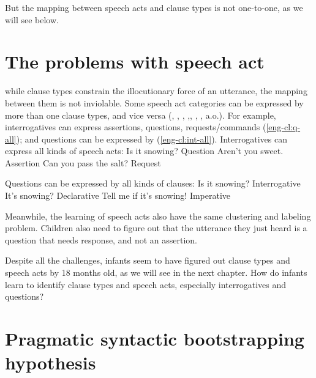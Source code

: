 But the mapping between speech acts and clause types is not one-to-one, as we will see below.







\section{The problems with speech act}
while clause types constrain the illocutionary force of an utterance, the mapping between them is not inviolable. Some speech act categories can be expressed by more than one clause types, and vice versa (\citealt{searle1975tax}, \citealt{searle1976class}, \citealt{bachharnish1979}, \citealt{levinson1983},\citealt{searlevanderveken1985}, \citealt{portner2018}, \citealt{starr2014}, \citealt{murraystarr2020} a.o.). For example, interrogatives can express assertions, questions, requests/commands (\ref{eng-cl:q-all}); and questions can be expressed by \diis{} (\ref{eng-cl:int-all}).
Interrogatives can express all kinds of speech acts:
\bxl Is it snowing? \hfill Question
\ex Aren't you sweet. \hfill Assertion
\ex Can you pass the salt? \hfill Request
\exl
\eex

Questions can be expressed by all kinds of clauses:
\bxl
Is it snowing? \hfill Interrogative
\ex It's snowing? \hfill Declarative
\ex Tell me if it's snowing! \hfill Imperative
\exl
\eex



Meanwhile, the learning of speech acts also have the same clustering and labeling problem. Children also need to figure out that the utterance they just heard is a question that needs response, and not an assertion. 


Despite all the challenges, infants seem to have figured out clause types and speech acts by 18 months old, as we will see in the next chapter. How do infants learn to identify clause types and speech acts, especially interrogatives and questions?

\section{Pragmatic syntactic bootstrapping hypothesis}
\label{sec:intro:prag-syn-bootstrap}

